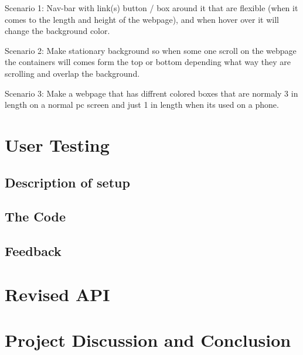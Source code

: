 \documentclass[12pt]{article}
\begin{document}
    Scenario 1: Nav-bar with link(s) button / box around it that are flexible (when it comes to the length and height of the webpage), and when hover over it will change the background color.
        
    Scenario 2: Make stationary background so when some one scroll on the webpage the containers will comes form the top or bottom depending what way they are scrolling and overlap the background.

    Scenario 3: Make a webpage that has diffrent colored boxes that are normaly 3 in length on a normal pc screen and just 1 in length when its used on a phone.


\section{User Testing}

\subsection{Description of setup}

\subsection{The Code}

\subsection{Feedback}

\section{Revised API}

\section{Project Discussion and Conclusion}
\end{document}
